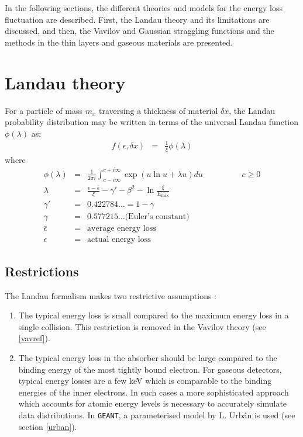 \documentclass{article}
\newcommand{\Emax}{\ensuremath{E_{\mathrm{max}}}}
\newcommand{\GEANT}{\texttt{GEANT}}
\begin{document}
In the following sections, the different theories and models for the
energy loss fluctuation are described. First, the Landau theory and
its limitations are discussed, and then, the Vavilov and Gaussian
straggling functions and the methods in the thin layers and gaseous
materials are presented.

\section{Landau theory}
\label{sec:phys332-1}

For a particle of mass $m_x$ traversing a thickness of material
$\delta x $, the Landau probability distribution may be written in
terms of the universal Landau function $\phi(\lambda)$
as\cite{bib-LAND}:
\begin{eqnarray*}
f( \epsilon , \delta x ) & = &\frac{1}{\xi} \phi ( \lambda )
\end{eqnarray*}
where
\begin{eqnarray*}
\phi(\lambda )& = & \frac{1} {2 \pi i}\int^{c+i\infty}_{c-i\infty}
\exp \left ( u \ln u + \lambda u \right ) du \hspace{2cm} c \geq 0 \\
\lambda       & = & \frac{\epsilon  -\bar{\epsilon} }{\xi}
  - \gamma' - \beta^2 - \ln \frac{\xi}{\Emax}          \\
\gamma' & = & 0.422784\dots = 1 - \gamma \\
\gamma             & = & 0.577215\dots \mbox{(Euler's constant)}   \\
\bar{\epsilon}  & = & \mbox{average energy loss}                    \\
\epsilon      & = & \mbox{actual energy loss}
\end{eqnarray*}

\subsection{Restrictions}

The Landau formalism makes two restrictive assumptions :
\begin{enumerate}
\item The typical energy loss is small compared to the maximum energy
  loss in a single collision.  This restriction is removed in the
  Vavilov theory (see \autoref{vavref}).
\item The typical energy loss in the absorber should be large compared
  to the binding energy of the most tightly bound electron.  For
  gaseous detectors, typical energy losses are a few keV which is
  comparable to the binding energies of the inner electrons.  In such
  cases a more sophisticated approach which accounts for atomic energy
  levels\cite{bib-TALM} is necessary to accurately simulate data
  distributions. In \GEANT, a parameterised model by L.  Urb\'{a}n is
  used (see section \ref{urban}).
\end{enumerate}
\end{document}
